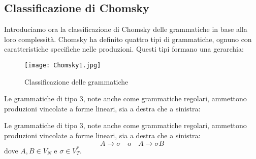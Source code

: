 \documentclass{article}
\begin{document}
\subsection{Classificazione di Chomsky}
Introduciamo ora la classificazione di Chomsky delle grammatiche in base alla loro complessità. Chomsky ha definito quattro tipi di grammatiche, ognuno con caratteristiche specifiche nelle produzioni. Questi tipi formano una gerarchia:

\begin{figure} [H]
    \centering
    \texttt{[image: Chomsky1.jpg]}
    \caption{Classificazione delle grammatiche}
    \label{fig:chomsky-classification}
\end{figure}

\noindent
Le grammatiche di tipo 3, note anche come grammatiche regolari, ammettono produzioni vincolate a forme lineari, sia a destra che a sinistra:
\begin{definition}
Le grammatiche di tipo 3, note anche come grammatiche regolari, ammettono produzioni vincolate a forme lineari, sia a destra che a sinistra:
\[
A \rightarrow \sigma \quad \text{o} \quad A \rightarrow \sigma B
\]
dove \( A, B \in V_N \) e \( \sigma \in V_T^* \).
\end{definition}
\end{document}

